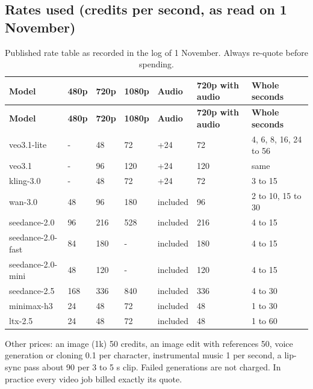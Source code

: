 \documentclass[11pt,a4paper]{article}
\begin{document}
\subsection{Rates used (credits per second, as read on 1 November)}
\begin{longtable}{@{}P{2.9cm}P{1.5cm}P{1.5cm}P{1.5cm}P{1.5cm}P{2.3cm}P{3.4cm}@{}}
\caption{Published rate table as recorded in the log of 1 November. Always re-quote before spending.}\\
\toprule \textbf{Model} & \textbf{480p} & \textbf{720p} & \textbf{1080p} & \textbf{Audio} & \textbf{720p with audio} & \textbf{Whole seconds}\\ \midrule\endfirsthead
\toprule \textbf{Model} & \textbf{480p} & \textbf{720p} & \textbf{1080p} & \textbf{Audio} & \textbf{720p with audio} & \textbf{Whole seconds}\\ \midrule\endhead
veo3.1-lite & - & 48 & 72 & +24 & 72 & 4, 6, 8, 16, 24 to 56\\
veo3.1 & - & 96 & 120 & +24 & 120 & same\\
kling-3.0 & - & 48 & 72 & +24 & 72 & 3 to 15\\
wan-3.0 & 48 & 96 & 180 & included & 96 & 2 to 10, 15 to 30\\
seedance-2.0 & 96 & 216 & 528 & included & 216 & 4 to 15\\
seedance-2.0-fast & 84 & 180 & - & included & 180 & 4 to 15\\
seedance-2.0-mini & 48 & 120 & - & included & 120 & 4 to 15\\
seedance-2.5 & 168 & 336 & 840 & included & 336 & 4 to 30\\
minimax-h3 & 24 & 48 & 72 & included & 48 & 1 to 30\\
ltx-2.5 & 24 & 48 & 72 & included & 48 & 1 to 60\\
\bottomrule
\end{longtable}
Other prices: an image (1k) 50 credits, an image edit with references 50, voice generation or cloning 0.1 per character, instrumental music 1 per second, a lip-sync pass about 90 per 3 to 5 s clip. Failed generations are not charged. In practice every video job billed exactly its quote.
\end{document}
